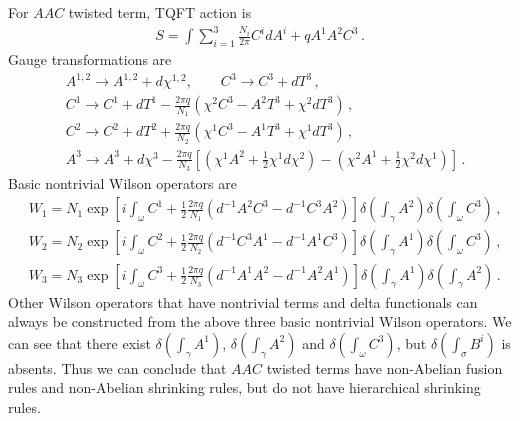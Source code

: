 \documentclass[11pt,nofootinbib,preprint]{revtex4-1}
\begin{document}
For $AAC$ twisted term, TQFT action is 
\begin{align}
	S=\int{\sum_{i=1}^3{\frac{N_i}{2\pi}C^idA^i+qA^1A^2C^3}}\,.
\end{align} 
Gauge transformations are 
\begin{align}
	&A^{1,2}\rightarrow A^{1,2}+d\chi ^{1,2},\qquad C^3\rightarrow C^3+dT^3\,, \nonumber
	\\
	&C^1\rightarrow C^1+dT^1-\frac{2\pi q}{N_1}\left( \chi ^2C^3-A^2T^3+\chi ^2dT^3 \right) \,,\nonumber
	\\
	&C^2\rightarrow C^2+dT^2+\frac{2\pi q}{N_2}\left( \chi ^1C^3-A^1T^3+\chi ^1dT^3 \right) \,,\nonumber
	\\
	&A^3\rightarrow A^3+d\chi ^3-\frac{2\pi q}{N_3}\left[ \left( \chi ^1A^2+\frac{1}{2}\chi ^1d\chi ^2 \right) - \left( \chi ^2A^1+\frac{1}{2}\chi ^2d\chi ^1 \right)\right]  \,.
\end{align}
Basic nontrivial Wilson operators are
\begin{align}
	&W_1=N_1\exp \left[ i\int_{\omega}{C^1+\frac{1}{2}\frac{2\pi q}{N_1}\left( d^{-1}A^2C^3-d^{-1}C^3A^2 \right)} \right] \delta \left( \int_{\gamma}{A^2} \right) \delta \left( \int_{\omega}{C^3} \right) \,,\nonumber
	\\
	&W_2=N_2\exp \left[ i\int_{\omega}{C^2+\frac{1}{2}\frac{2\pi q}{N_2}\left( d^{-1}C^3A^1-d^{-1}A^1C^3 \right)} \right] \delta \left( \int_{\gamma}{A^1} \right) \delta \left( \int_{\omega}{C^3} \right) \,,\nonumber
	\\
	&W_3=N_3\exp \left[ i\int_{\omega}{C^3+\frac{1}{2}\frac{2\pi q}{N_3}\left( d^{-1}A^1A^2-d^{-1}A^2A^1 \right)} \right] \delta \left( \int_{\gamma}{A^1} \right) \delta \left( \int_{\gamma}{A^2} \right) \,.
\end{align}
Other Wilson operators that have nontrivial terms and delta functionals can always be constructed from the above three basic nontrivial Wilson operators. We can see that there exist $\delta \left( \int_{\gamma}{A^1}\right)$, $\delta \left( \int_{\gamma}{A^2}\right)$ and $\delta \left( \int_{\omega}{C^3} \right)$, but $\delta \left( \int_{\sigma}{B^i} \right)$ is absents. Thus we can conclude that $AAC$ twisted terms have non-Abelian fusion rules and non-Abelian shrinking rules, but do not have hierarchical shrinking rules.
\end{document}
